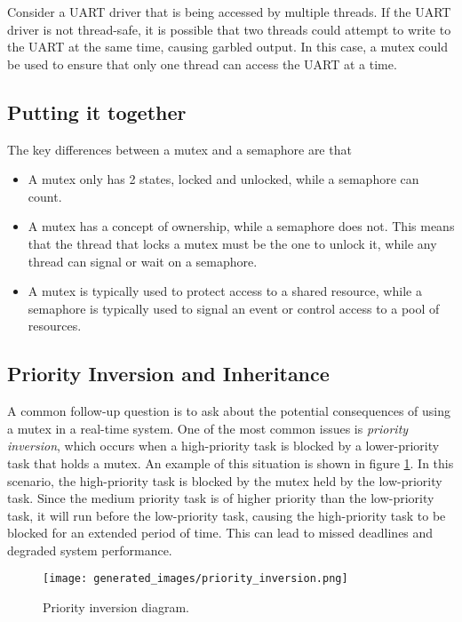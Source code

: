 \documentclass[main.tex]{subfiles}
\begin{document}
\noindent Consider a UART driver that is being accessed by multiple threads. If the UART driver is not thread-safe, it is possible that two threads could attempt to write to the UART at the same time, causing garbled output. In this case, a mutex could be used to ensure that only one thread can access the UART at a time.

\subsection{Putting it together}
The key differences between a mutex and a semaphore are that
\begin{itemize}
    \item A mutex only has 2 states, locked and unlocked, while a semaphore can count.
    \item A mutex has a concept of ownership, while a semaphore does not. This means that the thread that locks a mutex must be the one to unlock it, while any thread can signal or wait on a semaphore.
    \item A mutex is typically used to protect access to a shared resource, while a semaphore is typically used to signal an event or control access to a pool of resources.
\end{itemize}

\subsection{Priority Inversion and Inheritance}
A common follow-up question is to ask about the potential consequences of using a mutex in a real-time system. One of the most common issues is \textit{priority inversion}, which occurs when a high-priority task is blocked by a lower-priority task that holds a mutex. An example of this situation is shown in figure \ref{fig:priority_inversion}. In this scenario, the high-priority task is blocked by the mutex held by the low-priority task. Since the medium priority task is of higher priority than the low-priority task, it will run before the low-priority task, causing the high-priority task to be blocked for an extended period of time. This can lead to missed deadlines and degraded system performance.

\begin{figure}[H]
    \centering
    \texttt{[image: generated\_images/priority\_inversion.png]}
    \caption{Priority inversion diagram.}
    \label{fig:priority_inversion}
\end{figure}
\end{document}
